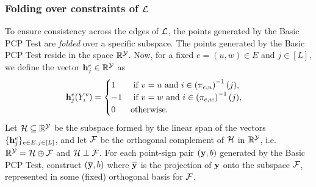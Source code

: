 \subsubsection{Folding over constraints of $\mathcal{L}$} \label{sec-folding}
To ensure consistency across the edges of $\mathcal{L}$, the points generated by the Basic PCP Test are \emph{folded} over a specific subspace.  The points generated by the Basic PCP Test reside in the space $\mathbb{R}^{\mathcal{Y}}$. 
Now, for a fixed $e=(u,w) \in E$ and $j \in [L]$, we define the vector ${\bf h}^{e}_j \in \mathbb{R}^{\mc{Y}}$ as 
\begin{align}
	{\bf h}^e_j(Y^v_i) &= \begin{cases}
		1 & \mbox{ if } v = u\tn{ and } i \in \left(\pi_{e,u}\right)^{-1}(j), \\
		-1 &\mbox{ if } v = w\tn{ and } i \in \left(\pi_{e,w}\right)^{-1}(j), \\
		0 & \mbox{otherwise.}
		\end{cases}
\end{align}
Let $\mathcal{H} \subseteq \mathbb{R}^{\mathcal{Y}}$ be the subspace formed by the linear span of the vectors $\{{\bf h}^e_{j}\}_{e \in E, j \in [L]}$, and let $\mathcal{F}$ be the orthogonal complement of $\mathcal{H}$ in $\mathbb{R}^{\mathcal{Y}}$, i.e. $\mathbb{R}^{\mathcal{Y}} = \mathcal{H}\oplus \mathcal{F}$ and $\mathcal{H}\perp \mathcal{F}$. For each point-sign pair $({\bf y},b)$ generated by the Basic PCP Test, construct $(\ol{{\bf y}},b)$ where $\ol{\bf y}$ is the projection of ${\bf y}$ onto the subspace $\mathcal{F}$, represented in some (fixed) orthogonal basis for $\mathcal{F}$. 

